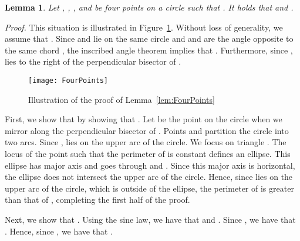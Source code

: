 \documentclass[12pt]{article}
\newtheorem{lem}[defin]{Lemma}
\newenvironment{lemma}{\begin{lem} \sl}{\end{lem}}
\newenvironment{proof}{\emph{Proof.}}{\hfill \\}
\begin{document}
\begin{lemma}
  \label{lem:FourPoints}
  Let , , , and  be four points on a circle such that . It holds that  and . 
\end{lemma}
\begin{proof}
  This situation is illustrated in Figure~\ref{fig:FourPoints}. Without loss of generality, we assume that . Since  and  lie on the same circle and  and  are the angle opposite to the same chord , the inscribed angle theorem implies that . Furthermore, since ,  lies to the right of the perpendicular bisector of . 

  \begin{figure}
    \begin{center}
      \texttt{[image: FourPoints]}
    \end{center}
    \caption{Illustration of the proof of Lemma~\ref{lem:FourPoints}}
    \label{fig:FourPoints}
  \end{figure}

  First, we show that  by showing that . Let  be the point on the circle when we mirror  along the perpendicular bisector of . Points  and  partition the circle into two arcs. Since ,  lies on the upper arc of the circle. We focus on triangle . The locus of the point  such that the perimeter of  is constant defines an ellipse. This ellipse has major axis  and goes through  and . Since this major axis is horizontal, the ellipse does not intersect the upper arc of the circle. Hence, since  lies on the upper arc of the circle, which is outside of the ellipse, the perimeter of  is greater than that of , completing the first half of the proof. 

  Next, we show that . Using the sine law, we have that   and . Since , we have that . Hence, since , we have that . 
\end{proof}
\end{document}
